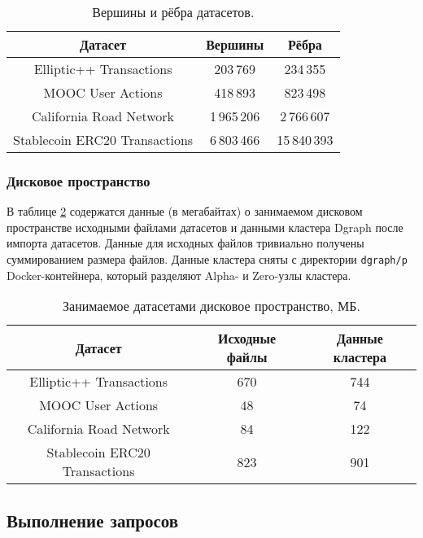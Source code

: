 \begin{table}[htb]
\caption{\centering Вершины и рёбра датасетов.}
\small
\centering\begin{tabular}{||c||c|c||}
\hline\hline
Датасет & Вершины & Рёбра \\
\hline\hline
Elliptic++ Transactions & 203\,769 & 234\,355 \\
\hline
MOOC User Actions & 418\,893 & 823\,498 \\
\hline
California Road Network & 1\,965\,206 & 2\,766\,607 \\
\hline
Stablecoin ERC20 Transactions & 6\,803\,466 & 15\,840\,393 \\ %
\hline\hline
\end{tabular}
\label{table:datasetsTopology}
\end{table}

\subsubsection{Дисковое пространство}

В таблице \ref{table:datasetsMemory} содержатся данные (в мегабайтах) о занимаемом дисковом
пространстве исходными файлами датасетов и данными кластера Dgraph после импорта датасетов.
Данные для исходных файлов тривиально получены суммированием размера файлов. Данные кластера
сняты с директории \texttt{dgraph/p} Docker-контейнера, который разделяют Alpha- и Zero-узлы
кластера.

\begin{table}[htb]
\caption{\centering Занимаемое датасетами дисковое пространство, МБ.}
\small
\centering\begin{tabular}{||c||c|c||}
\hline\hline
Датасет & Исходные файлы & Данные кластера \\
\hline\hline
Elliptic++ Transactions & 670 & 744 \\
\hline
MOOC User Actions & 48 & 74 \\
\hline
California Road Network & 84 & 122 \\
\hline
Stablecoin ERC20 Transactions & 823 & 901 \\
\hline\hline
\end{tabular}
\label{table:datasetsMemory}
\end{table}

\subsection{Выполнение запросов}

